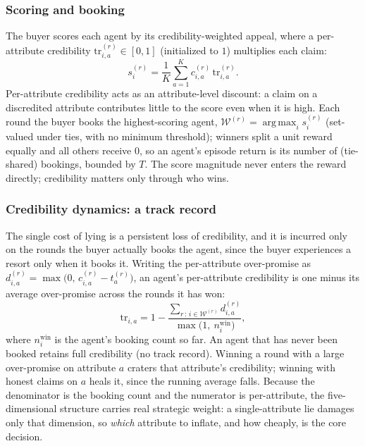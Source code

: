 \documentclass[conference]{IEEEtran}
\begin{document}
\subsubsection{Scoring and booking}
The buyer scores each agent by its credibility-weighted appeal, where a per-attribute credibility $\mathrm{tr}_{i,a}^{(r)}\in[0,1]$ (initialized to $1$) multiplies each claim:
\begin{equation}
s_i^{(r)} = \frac{1}{K}\sum_{a=1}^{K} c_{i,a}^{(r)}\,\mathrm{tr}_{i,a}^{(r)}.
\label{eq:dec5-score}
\end{equation}
Per-attribute credibility acts as an attribute-level discount: a claim on a discredited attribute contributes little to the score even when it is high. Each round the buyer books the highest-scoring agent, $\mathcal{W}^{(r)}=\operatorname*{arg\,max}_i s_i^{(r)}$ (set-valued under ties, with no minimum threshold); winners split a unit reward equally and all others receive $0$, so an agent's episode return is its number of (tie-shared) bookings, bounded by $T$. The score magnitude never enters the reward directly; credibility matters only through who wins.

\subsubsection{Credibility dynamics: a track record}
The single cost of lying is a persistent loss of credibility, and it is incurred only on the rounds the buyer actually books the agent, since the buyer experiences a resort only when it books it. Writing the per-attribute over-promise as $d_{i,a}^{(r)} = \max\!\bigl(0,\, c_{i,a}^{(r)} - t_a^{(r)}\bigr)$, an agent's per-attribute credibility is one minus its average over-promise across the rounds it has won:
\begin{equation}
\mathrm{tr}_{i,a} = 1 - \frac{\sum_{r\,:\,i\in\mathcal{W}^{(r)}} d_{i,a}^{(r)}}{\max\!\bigl(1,\ n_i^{\mathrm{win}}\bigr)},
\label{eq:dec5-trust}
\end{equation}
where $n_i^{\mathrm{win}}$ is the agent's booking count so far. An agent that has never been booked retains full credibility (no track record). Winning a round with a large over-promise on attribute $a$ craters that attribute's credibility; winning with honest claims on $a$ heals it, since the running average falls. Because the denominator is the booking count and the numerator is per-attribute, the five-dimensional structure carries real strategic weight: a single-attribute lie damages only that dimension, so \emph{which} attribute to inflate, and how cheaply, is the core decision.
\end{document}

